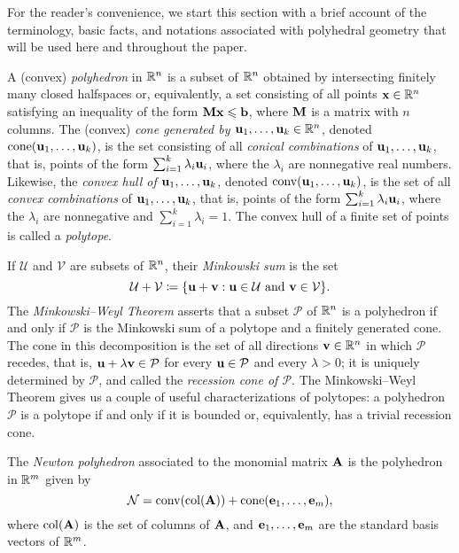 \documentclass{article}
\begin{document}
For the reader's convenience, we start this section with a brief account of the terminology, basic facts, and notations associated with polyhedral geometry that will be used here and throughout the paper.

A (convex) \emph{polyhedron} in $\mathbb{R}^n$ is a subset of $\mathbb{R}^n$ obtained by intersecting finitely many closed halfspaces or, equivalently, a set consisting of all points $\mathbf{x}\in \mathbb{R}^n$ satisfying an inequality of the form $\mathbf{M}\mathbf{x}\leqslant \mathbf{b}$, where $\mathbf{M}$ is a matrix with $n$ columns.
The (convex) \emph{cone generated by $\mathbf{u}_1,\ldots,\mathbf{u}_k \in \mathbb{R}^n$}, denoted $\operatorname{cone}(\mathbf{u}_1,\ldots,\mathbf{u}_k)$, is the set consisting of all \emph{conical combinations} of $\mathbf{u}_1, \ldots, \mathbf{u}_k$, that is, points of the form $\sum_{i=1}^k \lambda_i \mathbf{u}_i$, where the $\lambda_i$ are nonnegative real numbers.
Likewise, the \emph{convex hull of $\mathbf{u}_1,\ldots,\mathbf{u}_k$}, denoted $\operatorname{conv}(\mathbf{u}_1,\ldots,\mathbf{u}_k)$, is the set of all \emph{convex combinations} of $\mathbf{u}_1, \ldots, \mathbf{u}_k$, that is, points of the form $\sum_{i=1}^k \lambda_i \mathbf{u}_i$, where the $\lambda_i$ are nonnegative and $\sum_{i=1}^k \lambda_i = 1$.
The convex hull of a finite set of points is called a \emph{polytope}.

If $\mathcal{U}$ and $\mathcal{V}$ are subsets of $\mathbb{R}^n$, their \emph{Minkowski sum} is the set
\[\mathcal{U}+\mathcal{V} \coloneqq \{\mathbf{u}+\mathbf{v}: \mathbf{u}\in \mathcal{U}\text{ and }\mathbf{v}\in \mathcal{V}\}.\]
The \emph{Minkowski--Weyl Theorem} asserts that a subset $\mathcal{P}$ of $\mathbb{R}^n$ is a polyhedron if and only if $\mathcal{P}$ is the Minkowski sum of a polytope and a finitely generated cone.
The cone in this decomposition is the set of all directions $\mathbf{v} \in \mathbb{R}^n$ in which $\mathcal{P}$ recedes, that is, $\mathbf{u} + \lambda \mathbf{v} \in \mathcal{P}$ for every $\mathbf{u} \in \mathcal{P}$ and every $\lambda > 0$; it is uniquely determined by $\mathcal{P}$, and called the \emph{recession cone of $\mathcal{P}$}.
The Minkowski--Weyl Theorem gives us a couple of useful characterizations of polytopes: a polyhedron $\mathcal{P}$ is a polytope if and only if it is bounded or, equivalently, has a trivial recession cone.

\begin{definition}
The \emph{Newton polyhedron} associated to the monomial matrix $\mathbf{A}$ is the polyhedron in $\mathbb{R}^m$ given by
\[ \mathcal{N} = \operatorname{conv}( \operatorname{col}(\mathbf{A}) ) + \operatorname{cone}( \mathbf{e}_1, \ldots, \mathbf{e}_m), \]
where $\operatorname{col}(\mathbf{A})$ is the set of columns of $\mathbf{A}$, and $\mathbf{e}_1, \ldots, \mathbf{e}_m$ are the standard basis vectors of $\mathbb{R}^m$.
\end{definition}
\end{document}

